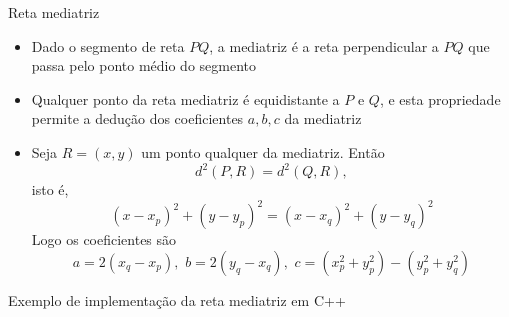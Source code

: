 \begin{frame}[fragile]{Reta mediatriz}

    \begin{itemize}
        \item Dado o segmento de reta $PQ$, a mediatriz é a reta perpendicular a $PQ$ que passa
            pelo ponto médio do segmento
        \pause

        \item Qualquer ponto da reta mediatriz é equidistante a $P$ e $Q$, e esta propriedade
            permite a dedução dos coeficientes $a, b, c$ da mediatriz
        \pause

        \item Seja $R = (x, y)$ um ponto qualquer da mediatriz. Então
        \[
            d^2(P, R) = d^2(Q, R),
        \]
        isto é,
        \[
            (x - x_p)^2 + (y - y_p)^2 = (x - x_q)^2 + (y - y_q)^2
        \]
        Logo os coeficientes são
        \[
            a = 2(x_q - x_p), \, \, b = 2(y_q - x_q), \, \, c = (x_p^2 + y_p^2) - (y_p^2 + y_q^2)
        \]
    \end{itemize}

\end{frame}

\begin{frame}[fragile]{Exemplo de implementação da reta mediatriz em C++}
\end{frame}

